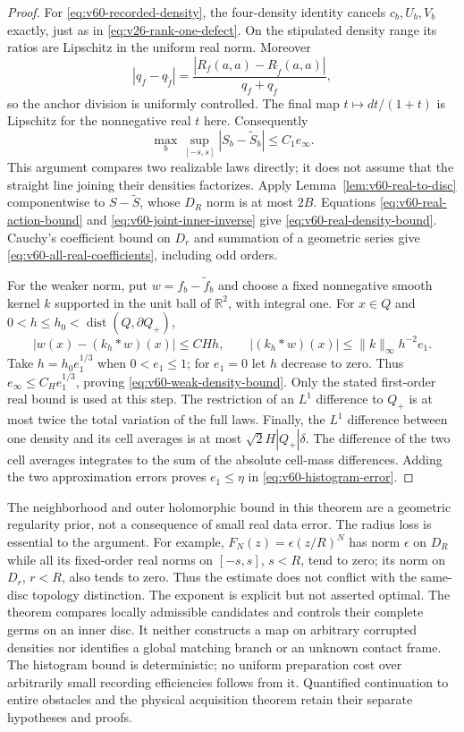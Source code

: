 \begin{proof}
For \eqref{eq:v60-recorded-density}, the four-density identity cancels
$c_b,U_b,V_b$ exactly, just as in
\eqref{eq:v26-rank-one-defect}.  On the stipulated density range its
ratios are Lipschitz in the uniform real norm.  Moreover
\[
 |q_f-q_{\widetilde f}|=
 \frac{|R_f(a,a)-R_{\widetilde f}(a,a)|}{q_f+q_{\widetilde f}},
\]
so the anchor division is uniformly controlled.  The final map
$t\mapsto dt/(1+t)$ is Lipschitz for the nonnegative real $t$ here.
Consequently
\begin{equation}\label{eq:v60-real-action-bound}
 \max_b\sup_{[-s,s]}|S_b-\widetilde S_b|\le C_1 e_\infty.
\end{equation}
This argument compares two realizable laws directly; it does not
assume that the straight line joining their densities factorizes.
Apply Lemma~\ref{lem:v60-real-to-disc} componentwise to
$S-\widetilde S$, whose $D_R$ norm is at most $2B$.
Equations \eqref{eq:v60-real-action-bound} and
\eqref{eq:v60-joint-inner-inverse} give
\eqref{eq:v60-real-density-bound}.  Cauchy's coefficient bound on
$D_r$ and summation of a geometric series give
\eqref{eq:v60-all-real-coefficients}, including odd orders.

For the weaker norm, put $w=f_b-\widetilde f_b$ and choose a fixed
nonnegative smooth kernel $k$ supported in the unit ball of
$\mathbb R^2$, with integral one.  For $x\in Q$ and
$0<h\le h_0<\operatorname{dist}(Q,\partial Q_+)$,
\[
 |w(x)-(k_h*w)(x)|\le C Hh,
 \qquad |(k_h*w)(x)|\le\|k\|_\infty h^{-2}e_1.
\]
Take $h=h_0 e_1^{1/3}$ when $0<e_1\le1$; for $e_1=0$ let
$h$ decrease to zero.  Thus $e_\infty\le C_H e_1^{1/3}$, proving
\eqref{eq:v60-weak-density-bound}.  Only the stated first-order real
bound is used at this step.  The restriction of an $L^1$ difference
to $Q_+$ is at most twice the total variation of the full laws.
Finally, the $L^1$ difference between one density and its cell averages
is at most $\sqrt2 H|Q_+|\delta$.  The difference of the two cell
averages integrates to the sum of the absolute cell-mass differences.
Adding the two approximation errors proves $e_1\le\eta$ in
\eqref{eq:v60-histogram-error}.
\end{proof}

The neighborhood and outer holomorphic bound in this theorem are a
geometric regularity prior, not a consequence of small real data error.
The radius loss is essential to the argument.  For example,
$F_N(z)=\epsilon(z/R)^N$ has norm $\epsilon$ on $D_R$ while all its
fixed-order real norms on $[-s,s]$, $s<R$, tend to zero; its norm on
$D_r$, $r<R$, also tends to zero.  Thus the estimate does not conflict
with the same-disc topology distinction.  The exponent is explicit
but not asserted optimal.  The theorem compares locally admissible
candidates and controls their complete germs on an inner disc.  It
neither constructs a map on arbitrary corrupted densities nor identifies
a global matching branch or an unknown contact frame.  The histogram
bound is deterministic; no uniform preparation cost over arbitrarily
small recording efficiencies follows from it.  Quantified continuation
to entire obstacles and the physical acquisition theorem retain their
separate hypotheses and proofs.
